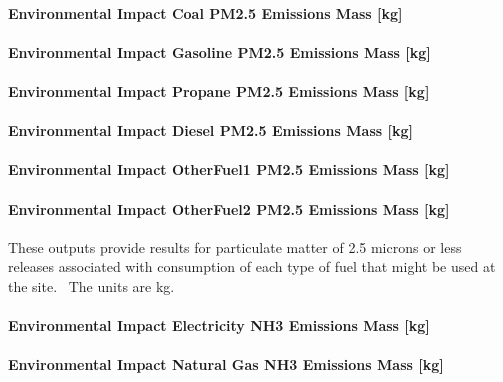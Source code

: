 \paragraph{Environmental Impact Coal PM2.5 Emissions Mass {[}kg{]}}\label{environmental-impact-coal-pm2.5-emissions-mass-kg}

\paragraph{Environmental Impact Gasoline PM2.5 Emissions Mass {[}kg{]}}\label{environmental-impact-gasoline-pm2.5-emissions-mass-kg}

\paragraph{Environmental Impact Propane PM2.5 Emissions Mass {[}kg{]}}\label{environmental-impact-propane-pm2.5-emissions-mass-kg}

\paragraph{Environmental Impact Diesel PM2.5 Emissions Mass {[}kg{]}}\label{environmental-impact-diesel-pm2.5-emissions-mass-kg}

\paragraph{Environmental Impact OtherFuel1 PM2.5 Emissions Mass {[}kg{]}}\label{environmental-impact-otherfuel1-pm2.5-emissions-mass-kg}

\paragraph{Environmental Impact OtherFuel2 PM2.5 Emissions Mass {[}kg{]}}\label{environmental-impact-otherfuel2-pm2.5-emissions-mass-kg}

These outputs provide results for particulate matter of 2.5 microns or less releases associated with consumption of each type of fuel that might be used at the site.~ The units are kg.

\paragraph{Environmental Impact Electricity NH3 Emissions Mass {[}kg{]}}\label{environmental-impact-electricity-nh3-emissions-mass-kg}

\paragraph{Environmental Impact Natural Gas NH3 Emissions Mass {[}kg{]}}\label{environmental-impact-natural-gas-nh3-emissions-mass-kg}

